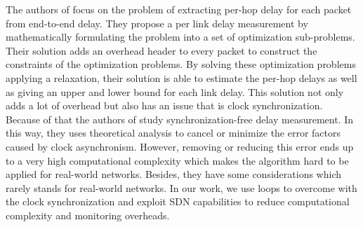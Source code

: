 \documentclass[10pt, journal, letterpaper]{IEEEtran}
\begin{document}



The authors of \cite{gao2016accurate} focus on the problem of extracting per-hop delay for each packet from end-to-end delay. They propose a per link delay measurement by mathematically formulating the problem into a set of optimization sub-problems. Their solution adds an overhead header to every packet to construct the constraints of the optimization problems. By solving these optimization problems applying a relaxation, their solution is able to estimate the per-hop delays as well as giving an upper and lower bound for each link delay. This solution not only adds a lot of overhead but also has an issue that is clock synchronization. Because of that the authors of \cite{nakanishi2018route} study synchronization-free delay measurement. In this way, they uses theoretical analysis to cancel or minimize the error factors caused by clock asynchronism. However, removing or reducing this error ends up to a very high computational complexity which makes the algorithm hard to be applied for real-world networks. Besides, they have some considerations which rarely stands for real-world networks. In our work, we use loops to overcome with the clock synchronization and exploit SDN capabilities to reduce computational complexity and monitoring overheads.
\end{document}
